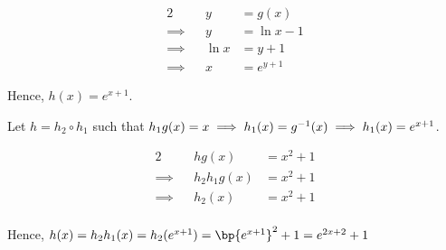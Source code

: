 \documentclass{echw}
\begin{document}
                \begin{alignat*}{2}
                    &&y &= g(x)\\
                    \implies&&y &= \ln x - 1\\
                    \implies&&\ln x &= y+1\\
                    \implies&&x &= e^{y+1}
                \end{alignat*}

                Hence, $h(x) = e^{x+1}$.


            \subpart
                Let $h = h_2 \circ h_1$ such that $h_1g(x) = x \implies h_1(x) = g^{-1}(x) \implies h_1(x) = e^{x+1}$.

                \begin{alignat*}{2}
                    &&hg(x) &= x^2+1\\
                    \implies&&h_2h_1g(x) &= x^2+1\\
                    \implies&&h_2(x) &= x^2+1\\
                \end{alignat*}

                Hence, $h(x) = h_2h_1(x) = h_2(e^{x+1}) = \bp{e^{x+1}}^2 + 1 = e^{2x+2} + 1$

\end{document}
